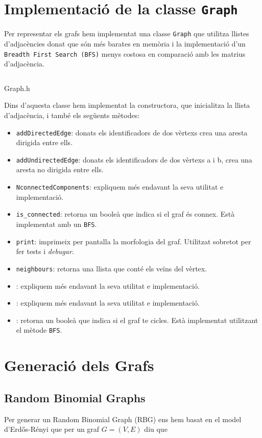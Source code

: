 \section{Implementació de la classe \texttt{Graph}}
Per representar els grafs hem implementat una classe \texttt{Graph} que utilitza llistes d'adjacències donat que són més barates en memòria i la implementació d'un \texttt{Breadth First Search (BFS)} menys costosa en comparació amb les matrius d'adjacència.

\begin{listing}
\inputminted{cpp}{src/graph.h}
\caption{Graph.h}
\end{listing}

Dins d'aquesta classe hem implementat la constructora, que inicialitza la llista d'adjacència, i també els següents mètodes:
\begin{itemize}
    \item\texttt{addDirectedEdge}: donats els identificadors de dos vèrtexs crea una aresta dirigida entre ells.
    \item\texttt{addUndirectedEdge}: donats els identificadors de dos vèrtexs a i b, crea una aresta no dirigida entre ells.
    \item\texttt{NconnectedComponents}: expliquem més endavant la seva utilitat e implementació.
    \item\texttt{is\_connected}: retorna un booleà que indica si el graf és connex. Està implementat amb un \texttt{BFS}.
    \item\texttt{print}: imprimeix per pantalla la morfologia del graf. Utilitzat sobretot per fer tests i \textit{debugar}.
    \item\texttt{neighbours}: retorna una llista que conté els veïns del vèrtex.
    \item{}: expliquem més endavant la seva utilitat e implementació.
    \item{}: expliquem més endavant la seva utilitat e implementació.
    \item{}: retorna un booleà que indica si el graf te cicles. Està implementat utilitzant el mètode \texttt{BFS}.
\end{itemize}

\section{Generació dels Grafs}
\subsection{Random Binomial Graphs}
Per generar un Random Binomial Graph (RBG) ens hem basat en el model d'Erdős-Rényi \cite{Erdos1960OnGraphs,Erdos1959OnI} que per un graf $G=(V,E)$ diu que

